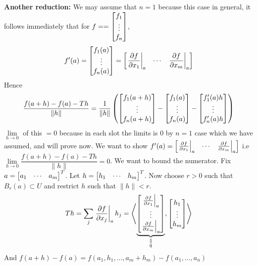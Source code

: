\begin{myproof}
\textbf{Another reduction: }We may assume that $n=1$ because this case in general, it follows immediately  that for $f==\left[ \begin{matrix}
	f_1\\ \vdots\\ f_n
\end{matrix} \right]$, $$f'(a)=\left[ \begin{matrix}
f_1(a)\\ \vdots\\ f_n(a)
\end{matrix} \right]=\left[ \begin{matrix}
\left.\dfrac{\partial f}{\partial x_1}\right|_a & \cdots & \left.\dfrac{\partial f}{\partial x_m}\right|_a
\end{matrix} \right]$$Hence $$\dfrac{f(a+h)-f(a)-Th}{\|h\|}=\frac1{\|h\|}\left( \left[ \begin{matrix}
f_1(a+h)\\ \vdots\\ f_n(a+h)
\end{matrix} \right]-\left[ \begin{matrix}
f_1(a)\\ \vdots\\ f_n(a)
\end{matrix} \right]-\left[ \begin{matrix}
f_1'(a)h\\ \vdots\\ f_n'(a)h
\end{matrix} \right] \right)$$$\lim\limits_{h\to 0}$ of this $= 0$ because in each slot the limits is 0 by $n=1$ case which we have assumed, and will prove now.
\vspace*{2mm}
We want to show $f'(a)=\left[\begin{matrix}
	\left.\frac{\partial f}{\partial x_1}\right|_a & \cdots & \left.\frac{\partial f}{\partial x_m}\right|_a
\end{matrix} \right]$ i.e $\lim\limits_{h\to 0}\dfrac{f(a+h)-f(a)-Th}{\|h\|}=0$. We want to bound the numerator. Fix $a=\left[ \begin{matrix}
a_1 & \cdots & a_m
\end{matrix} \right]^T$. Let $h=\left[ \begin{matrix}
h_1 & \cdots & h_m
\end{matrix} \right]^T$. Now choose $r>0$ such that $B_r(a)\subset U$ and restrict $h$ such that $\|h\|<r$. \[ Th=\sum_j\left.\dfrac{\partial f}{\partial x_j}\right|_ah_j = \left\langle \underbrace{\left[\begin{matrix}
	\left.\frac{\partial f}{\partial x_1}\right|_a \\ \vdots \\ \left.\frac{\partial f}{\partial x_m}\right|_a
\end{matrix} \right]}_{\substack{\parallel \\ q}}, \left[ \begin{matrix}
h_1 \\ \vdots \\ h_m
\end{matrix} \right] \right\rangle \]And $f(a+h)-f(a)=f(a_1,h_1,\dots, a_m+h_m)-f(a_1,\dots, a_n)$


\end{myproof}

